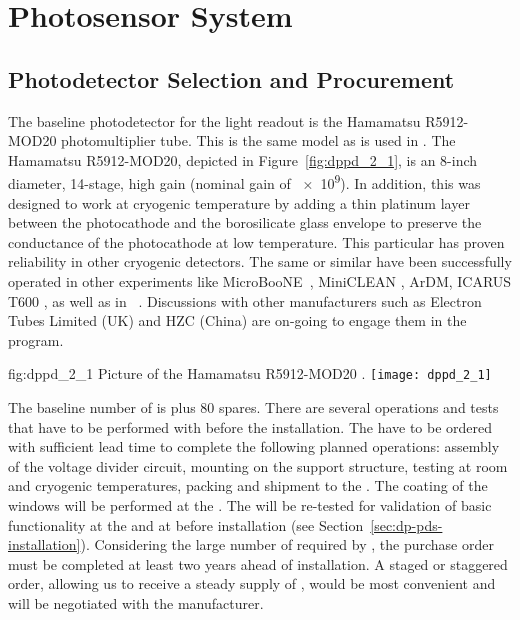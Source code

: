 \section{Photosensor System}
\label{sec:dp-pds-photosensors}

\subsection{Photodetector Selection and Procurement}
\label{sec:dp-pds-selection-procurement}

The baseline photodetector for the light readout is the Hamamatsu R5912-MOD20 photomultiplier tube. This is the same model as is used in . The Hamamatsu R5912-MOD20, depicted in  Figure~\ref{fig:dppd_2_1}, is an 8-inch diameter, 14-stage, high gain  (nominal gain of \num{e9}). In addition, this  was designed to work at cryogenic temperature by adding a thin platinum layer between the photocathode and the borosilicate glass envelope to preserve the conductance of the photocathode at low temperature. This particular  has proven reliability in other cryogenic detectors. The same or similar  have been successfully operated in other \lar experiments like MicroBooNE~\cite{microboone}, MiniCLEAN \cite{miniclean}, ArDM, ICARUS T600 \cite{icarus}, as well as in ~\cite{protoDUNDP-tdr}. Discussions with other manufacturers such as Electron Tubes Limited (UK) \cite{electrontubeslim} and HZC (China) \cite{hzc} are on-going to engage them in the program.

\begin{dunefigure}{fig:dppd_2_1}
{Picture of the Hamamatsu R5912-MOD20  \cite{hamamatsu-5912}.}
\texttt{[image: dppd\_2\_1]}
\end{dunefigure}

The baseline number of  is \dpnumpmtch plus \num{80} spares.  There are several operations and tests that have to be performed with  before the installation. The  have to be ordered with sufficient lead time to complete the following planned operations: assembly of the voltage divider circuit, mounting on the support structure, testing at room and cryogenic temperatures, packing and shipment to the . The  coating of the  windows will be performed at the . The  will be re-tested for validation of basic functionality at the  and at \surf before installation (see Section~\ref{sec:dp-pds-installation}). Considering the large number of  required by \dual {}, the purchase order must be completed at least two years ahead of installation. A staged or staggered order, allowing us to receive a steady supply of , would be most convenient and will be negotiated with the manufacturer. 

